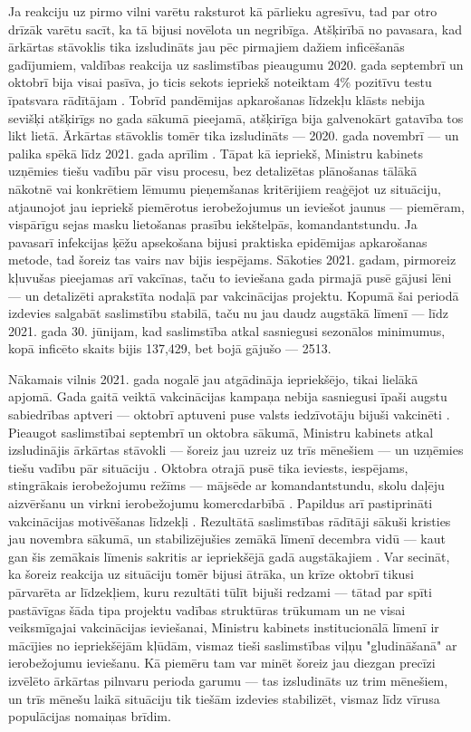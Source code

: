 \documentclass[12pt, a4paper]{article}
\numberwithin{equation}{section} %
\begin{document}
Ja reakciju uz pirmo vilni varētu raksturot kā pārlieku agresīvu, tad par otro drīzāk varētu sacīt, ka tā bijusi novēlota un negribīga. Atšķirībā no pavasara, kad ārkārtas stāvoklis tika izsludināts jau pēc pirmajiem dažiem inficēšanās gadījumiem, valdības reakcija uz saslimstības pieaugumu 2020. gada septembrī un oktobrī bija visai pasīva, jo ticis sekots iepriekš noteiktam 4\% pozitīvu testu īpatsvara rādītājam \cite{lv_october_2020_spread}. Tobrīd pandēmijas apkarošanas līdzekļu klāsts nebija sevišķi atšķirīgs no gada sākumā pieejamā, atšķirīga bija galvenokārt gatavība tos likt lietā. Ārkārtas stāvoklis tomēr tika izsludināts --- 2020. gada novembrī --- un palika spēkā līdz 2021. gada aprīlim \cite{lv_emergency_2020_fall}. Tāpat kā iepriekš, Ministru kabinets uzņēmies tiešu vadību pār visu procesu, bez detalizētas plānošanas tālākā nākotnē vai konkrētiem lēmumu pieņemšanas kritērijiem reaģējot uz situāciju, atjaunojot jau iepriekš piemērotus ierobežojumus un ieviešot jaunus --- piemēram, vispārīgu sejas masku lietošanas prasību iekštelpās, komandantstundu. Ja pavasarī infekcijas ķēžu apsekošana bijusi praktiska epidēmijas apkarošanas metode, tad šoreiz tas vairs nav bijis iespējams. Sākoties 2021. gadam, pirmoreiz kļuvušas pieejamas arī vakcīnas, taču to ieviešana gada pirmajā pusē gājusi lēni --- un detalizēti aprakstīta nodaļā par vakcinācijas projektu. Kopumā šai periodā izdevies salgabāt saslimstību stabilā, taču nu jau daudz augstākā līmenī --- līdz 2021. gada 30. jūnijam, kad saslimstība atkal sasniegusi sezonālos minimumus, kopā inficēto skaits bijis 137,429, bet bojā gājušo --- 2513.

Nākamais vilnis 2021. gada nogalē jau atgādināja iepriekšējo, tikai lielākā apjomā. Gada gaitā veiktā vakcinācijas kampaņa nebija sasniegusi īpaši augstu sabiedrības aptveri --- oktobrī aptuveni puse valsts iedzīvotāju bijuši vakcinēti \cite{lv_vaccine_half_2021_october}. Pieaugot saslimstībai septembrī un oktobra sākumā, Ministru kabinets atkal izsludinājis ārkārtas stāvokli --- šoreiz jau uzreiz uz trīs mēnešiem --- un uzņēmies tiešu vadību pār situāciju \cite{lv_emergency_2021}. Oktobra otrajā pusē tika ieviests, iespējams, stingrākais ierobežojumu režīms --- mājsēde ar komandantstundu, skolu daļēju aizvēršanu un virkni ierobežojumu komercdarbībā \cite{lv_lockdown_2021}. Papildus arī pastiprināti vakcinācijas motivēšanas līdzekļi \cite{lv_fire_unvaccinated}. Rezultātā saslimstības rādītāji sākuši kristies jau novembra sākumā, un stabilizējušies zemākā līmenī decembra vidū --- kaut gan šis zemākais līmenis sakritis ar iepriekšējā gadā augstākajiem \cite{lv_stats}. Var secināt, ka šoreiz reakcija uz situāciju tomēr bijusi ātrāka, un krīze oktobrī tikusi pārvarēta ar līdzekļiem, kuru rezultāti tūlīt bijuši redzami --- tātad par spīti pastāvīgas šāda tipa projektu vadības struktūras trūkumam un ne visai veiksmīgajai vakcinācijas ieviešanai, Ministru kabinets institucionālā līmenī ir mācījies no iepriekšējām kļūdām, vismaz tieši saslimstības viļņu "gludināšanā" ar ierobežojumu ieviešanu. Kā piemēru tam var minēt šoreiz jau diezgan precīzi izvēlēto ārkārtas pilnvaru perioda garumu --- tas izsludināts uz trim mēnešiem, un trīs mēnešu laikā situāciju tik tiešām izdevies stabilizēt, vismaz līdz vīrusa populācijas nomaiņas brīdim. 
\end{document}
